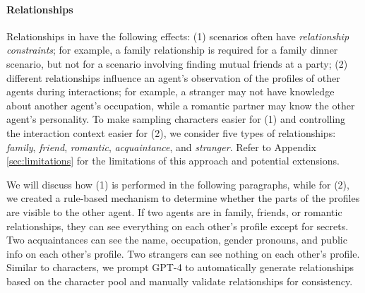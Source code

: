 \paragraph{Relationships}
Relationships in \sotopia have the following effects: (1) scenarios often have \textit{relationship constraints}; for example, a family relationship is required for a family dinner scenario, but not for a scenario involving finding mutual friends at a party; (2) different relationships influence an agent's observation of the profiles of other agents during interactions; for example, a stranger may not have knowledge about another agent's occupation, while a romantic partner may know the other agent's personality. To make sampling characters easier for (1) and controlling the interaction context easier for (2), we consider five types of relationships: \textit{family}, \textit{friend}, \textit{romantic}, \textit{acquaintance}, and \textit{stranger}. Refer to Appendix \ref{sec:limitations} for the limitations of this approach and potential extensions.

We will discuss how (1) is performed in the following paragraphs, while for (2), we created a rule-based mechanism to determine whether the parts of the profiles are visible to the other agent. If two agents are in family, friends, or romantic relationships, they can see everything on each other's profile except for secrets. Two acquaintances can see the name, occupation, gender pronouns, and public info on each other's profile. Two strangers can see nothing on each other's profile. Similar to characters, we prompt GPT-4 \citep{openai2023gpt4} to automatically generate relationships based on the character pool and manually validate relationships for consistency. 


